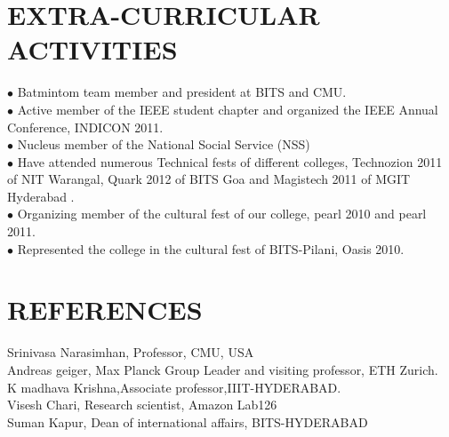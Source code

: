 \documentclass[a4paper,10pt]{article}
\begin{document}

\section{EXTRA-CURRICULAR ACTIVITIES} 
$\bullet$ Batmintom team member and president at BITS and CMU.\\
$\bullet$ Active member of the IEEE student chapter and organized the IEEE Annual Conference, INDICON 2011.\\
$\bullet$ Nucleus member of the National Social Service (NSS) \\
$\bullet$ Have attended numerous Technical fests of different colleges, Technozion 2011 of NIT Warangal, Quark 2012 of BITS Goa and Magistech 2011 of MGIT Hyderabad .\\
$\bullet$ Organizing member of the cultural fest of our college, pearl 2010 and pearl 2011.\\
$\bullet$ Represented the college in the cultural fest of BITS-Pilani, Oasis 2010.\\
\section{REFERENCES} 
Srinivasa Narasimhan, Professor, CMU, USA\\
Andreas geiger, Max Planck Group Leader and visiting professor, ETH Zurich.\\
K madhava Krishna,Associate professor,IIIT-HYDERABAD.\\
Visesh Chari, Research scientist, Amazon Lab126\\
Suman Kapur, Dean of international affairs, BITS-HYDERABAD\\ 
\end{document}
